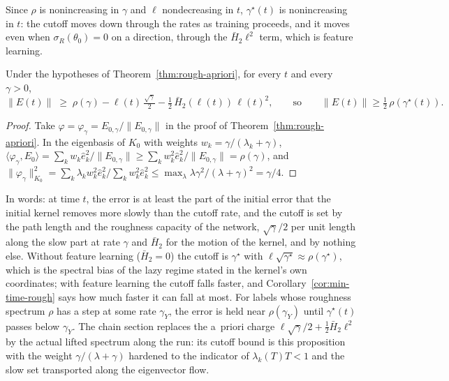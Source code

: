 Since $\rho$ is nonincreasing in $\gamma$ and $\ell$ nondecreasing in $t$,
$\gamma^\star(t)$ is nonincreasing in $t$: the cutoff moves down through the
rates as training proceeds, and it moves even when $\sigma_R(\theta_0)=0$ on
a direction, through the $\bar H_2\ell^2$ term, which is feature learning.

\begin{proposition}
\label{prop:cutoff-floor}
Under the hypotheses of Theorem~\ref{thm:rough-apriori}, for every $t$ and
every $\gamma>0$,
\begin{equation}
\|E(t)\| \;\ge\; \rho(\gamma)-\ell(t)\,\tfrac{\sqrt\gamma}{2}-\tfrac12\,\bar H_2(\ell(t))\,\ell(t)^2,
\qquad\text{so}\qquad
\|E(t)\|\ge\tfrac12\,\rho(\gamma^\star(t)) .
\label{eq:cutoff-floor}
\end{equation}
\end{proposition}

\begin{proof}
Take $\varphi=\varphi_\gamma=E_{0,\gamma}/\|E_{0,\gamma}\|$ in the proof of
Theorem~\ref{thm:rough-apriori}. In the eigenbasis of $K_0$ with weights
$w_k=\gamma/(\lambda_k+\gamma)$, $\langle\varphi_\gamma,E_0\rangle=\sum_kw_k\hat e_k^2/\|E_{0,\gamma}\|\ge\sum_kw_k^2\hat e_k^2/\|E_{0,\gamma}\|=\rho(\gamma)$,
and $\|\varphi_\gamma\|_{K_0}^2=\sum_k\lambda_kw_k^2\hat e_k^2/\sum_kw_k^2\hat e_k^2\le\max_\lambda\lambda\gamma^2/(\lambda+\gamma)^2=\gamma/4$.
\end{proof}

In words: at time $t$, the error is at least the part of the initial error
that the initial kernel removes more slowly than the cutoff rate, and the
cutoff is set by the path length and the roughness capacity of the network,
$\sqrt\gamma/2$ per unit length along the slow part at rate $\gamma$ and
$\bar H_2$ for the motion of the kernel, and by nothing else. Without feature
learning ($\bar H_2=0$) the cutoff is $\gamma^\star$ with
$\ell\sqrt{\gamma^\star}\approx\rho(\gamma^\star)$, which is the spectral
bias of the lazy regime stated in the kernel's own coordinates; with feature
learning the cutoff falls faster, and Corollary~\ref{cor:min-time-rough} says
how much faster it can fall at most. For labels whose roughness spectrum
$\rho$ has a step at some rate $\gamma_Y$, the error is held near
$\rho(\gamma_Y)$ until $\gamma^\star(t)$ passes below $\gamma_Y$. The chain
section replaces the a~priori charge $\ell\sqrt\gamma/2+\tfrac12\bar H_2\ell^2$
by the actual lifted spectrum along the run: its cutoff bound is this
proposition with the weight $\gamma/(\lambda+\gamma)$ hardened to the
indicator of $\lambda_k(T)T<1$ and the slow set transported along the
eigenvector flow.

